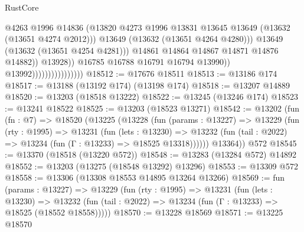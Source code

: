 \begin{lexlean}{RustCore}
\begin{coremodule}
                                                    @4263
                                                    @1996
                                                    @14836
                                                    (@13820
                                                      @4273
                                                      @1996
                                                      @13831
                                                      @13645
                                                      @13649
                                                      (@13632 (@13651 @4274 @2012)))
                                                    @13649
                                                    (@13632 (@13651 @4264 @4280)))
                                                  @13649
                                                  (@13632 (@13651 @4254 @4281)))
                                                @14861
                                                @14864
                                                @14867
                                                @14871
                                                @14876
                                                @14882))
                                            @13928))
                                        @16785
                                        @16788
                                        @16791
                                        @16794
                                        @13990))
                                    @13992))))))))))))))))
@18512 := @17676 @18511
@18513 := @13186 @174
@18517 := @13188 (@13192 @174) (@13198 @174)
@18518 := @13207 @14889
@18520 := @13203 (@18518 @13222)
@18522 := @13245 (@13246 @174)
@18523 := @13241 @18522
@18525 := @13203 (@18523 @13271)
@18542 := @13202
    (fun (fn : @7) =>
    @18520
      (@13225
        (@13228
          (fun (params : @13227) =>
          @13229
            (fun (rty : @1995) =>
            @13231
              (fun (lets : @13230) =>
              @13232 (fun (tail : @2022) => @13234 (fun (Γ : @13233) => @18525 @13318))))))
        @13364))
    @572
@18545 := @13370 (@18518 (@13220 @572))
@18548 := @13283 (@13284 @572) @14892
@18552 := @13203 (@13275 (@18548 @13292) @13296)
@18553 := @13309 @572
@18558 := @13306 (@13308 @18553 @14895 @13264 @13266)
@18569 := fun (params : @13227) =>
  @13229
    (fun (rty : @1995) =>
    @13231
      (fun (lets : @13230) =>
      @13232 (fun (tail : @2022) => @13234 (fun (Γ : @13233) => @18525 (@18552 @18558)))))
@18570 := @13228 @18569
@18571 := @13225 @18570

\end{coremodule}
\end{lexlean}
